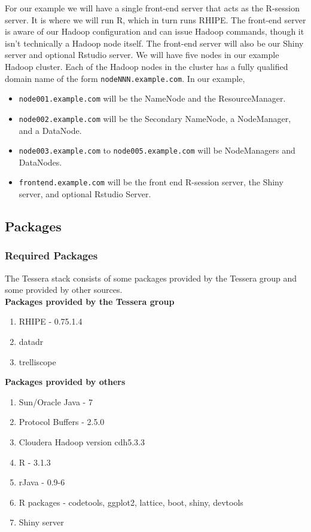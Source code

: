 For our example we will have a single front-end server that acts as the
R-session server.  It is where we will run R, which in turn runs RHIPE.
The front-end server is aware of our Hadoop configuration and can issue
Hadoop commands, though it isn't technically a Hadoop node itself. The
front-end server will also be our Shiny server and optional Rstudio
server.  We will have five nodes in our example Hadoop cluster.  Each of
the Hadoop nodes in the cluster has a fully qualified domain
name of the form \verb|nodeNNN.example.com|. In our example,

\begin{itemize}
\item \verb|node001.example.com| will be the NameNode and the ResourceManager.
\item \verb|node002.example.com| will be the Secondary NameNode, a NodeManager, and a DataNode. 
\item \verb|node003.example.com| to \verb|node005.example.com| will be NodeManagers and DataNodes. 
\item \verb|frontend.example.com| will be the front end R-session server, the Shiny server, and optional Rstudio Server.
\end{itemize}

\subsection{Packages}
\subsubsection{Required Packages}
The Tessera stack consists of some packages provided by the Tessera group and some provided by other sources. \\

\textbf{Packages provided by the Tessera group}
\begin{enumerate}
\item RHIPE - 0.75.1.4
\item datadr
\item trelliscope
\end{enumerate}
\textbf{Packages provided by others}
\begin{enumerate}
\item Sun/Oracle Java - 7
\item Protocol Buffers - 2.5.0 
\item Cloudera Hadoop version cdh5.3.3
\item R - 3.1.3
\item rJava - 0.9-6 
\item R packages - codetools, ggplot2, lattice, boot, shiny, devtools
\item Shiny server
\end{enumerate}

